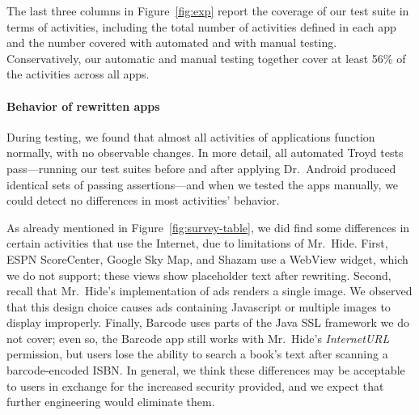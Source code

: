 \documentclass[preprint]{sig-alternate-10pt}
\newcommand{\lib}{Mr.\ Hide\xspace}
\newcommand{\rewriter}{Dr.\ Android\xspace}
\newcommand{\troyd}{Troyd\xspace}
\newcommand{\perm}[1]{\textsf{\textit{#1}}}
\newcommand{\comment}[3][\color{red}]{}%
\newcommand{\jeff}[1]{\comment[\color{green}]{JSF}{#1}}
\newcommand{\jsjeon}[1]{\comment[\color{red}]{JJ}{#1}}
\begin{document}
The last three
columns in Figure~\ref{fig:exp} report the coverage of our test suite
in terms of activities, including the total number of
activities defined in each app and the number covered
with automated and with manual testing.  Conservatively, our automatic and
manual testing together cover at least 56\% of the activities across all apps.


\paragraph*{Behavior of rewritten apps}

During testing, we found that almost all activities of applications
function normally, with no observable changes. In more detail, all automated
\troyd tests pass---running our test suites before and after applying
\rewriter produced identical sets of passing assertions---and when we
tested the apps manually, we could detect no differences in most
activities' behavior.

As already mentioned in Figure~\ref{fig:survey-table}, we did find
some differences in certain activities that use the Internet, due
to limitations of \lib.  First, ESPN ScoreCenter, Google Sky Map, and
Shazam use a WebView widget, which we do not support; these views show
placeholder text after rewriting.  %
Second, recall that \lib's implementation of ads renders a single
image.  We observed that this design choice causes ads containing
Javascript or multiple images to display improperly.
Finally, Barcode uses parts of the Java SSL
framework we do not cover; even so, the Barcode app still
works with \lib's \perm{InternetURL} permission, but
users lose the ability to search a
book's text after scanning a barcode-encoded ISBN.  In general,
  we think these differences may be acceptable to users in exchange for the increased
  security provided, and we expect that further engineering would
  eliminate them.

\end{document}
